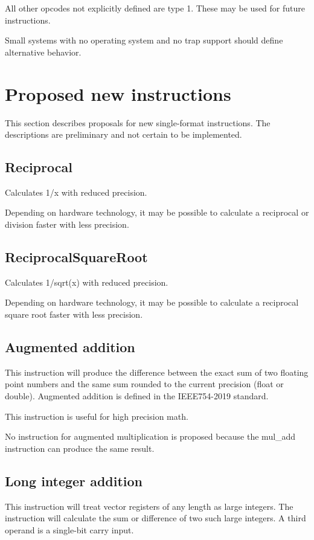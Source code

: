 \documentclass[forwardcom.tex]{subfiles}
\begin{document}
All other opcodes not explicitly defined are type 1. These may be used for future instructions.
\vv

Small systems with no operating system and no trap support should define alternative behavior.
\vv

\section{Proposed new instructions}
This section describes proposals for new single-format instructions. The descriptions are preliminary and not certain to be implemented.
\vv

\subsection{Reciprocal}
Calculates 1/x with reduced precision.
\vv

Depending on hardware technology, it may be possible to calculate a reciprocal or division faster with less precision.
\vv


\subsection{ReciprocalSquareRoot}
Calculates 1/sqrt(x) with reduced precision.
\vv

Depending on hardware technology, it may be possible to calculate a reciprocal square root faster with less precision.
\vv


\subsection{Augmented addition}
This instruction will produce the difference between the exact sum of two floating point numbers and the same sum rounded to the current precision (float or double). Augmented addition is defined in the IEEE754-2019 standard.
\vv

This instruction is useful for high precision math.
\vv

No instruction for augmented multiplication is proposed because the mul\_add instruction can produce the same result.
\vv

\subsection{Long integer addition}
This instruction will treat vector registers of any length as large integers. The instruction will calculate the sum or difference of two such large integers. A third operand is a single-bit carry input.
\vv
\end{document}
